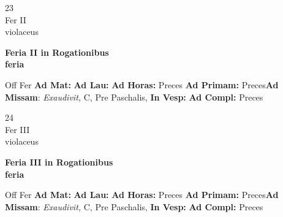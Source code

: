 \documentclass[10pt, openany]{book}
\begin{document}
    \begin{center}
        \begin{minipage}{3.5in}
            \vspace{2em}
            \begin{minipage}{0.5in}
                {\Huge 23} \\
                {\normalsize Fer II} \\
                {\normalsize violaceus}
            \end{minipage}
            \begin{minipage}{3.0in}
                \textbf{ \large Feria II in Rogationibus \\
                \textnormal{\normalsize feria}} \\ 
            \end{minipage}
            \begin{justify}Off Fer
                \textbf{Ad Mat: }
                \textbf{Ad Lau: }
                \textbf{Ad Horas: }Preces
                \textbf{Ad Primam: }Preces\textbf{Ad Missam}: \textit{Exaudivit,} C, Pre Paschalis,  
                \textbf{In Vesp: }
                \textbf{Ad Compl: }Preces
            \end{justify}
        \end{minipage}
    \end{center}

    \begin{center}
        \begin{minipage}{3.5in}
            \vspace{2em}
            \begin{minipage}{0.5in}
                {\Huge 24} \\
                {\normalsize Fer III} \\
                {\normalsize violaceus}
            \end{minipage}
            \begin{minipage}{3.0in}
                \textbf{ \large Feria III in Rogationibus \\
                \textnormal{\normalsize feria}} \\ 
            \end{minipage}
            \begin{justify}Off Fer
                \textbf{Ad Mat: }
                \textbf{Ad Lau: }
                \textbf{Ad Horas: }Preces
                \textbf{Ad Primam: }Preces\textbf{Ad Missam}: \textit{Exaudivit,} C, Pre Paschalis,  
                \textbf{In Vesp: }
                \textbf{Ad Compl: }Preces
            \end{justify}
        \end{minipage}
    \end{center}
\end{document}
